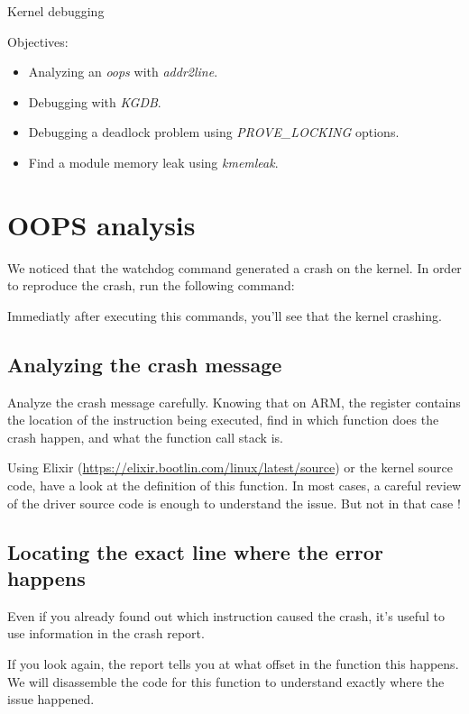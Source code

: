 \subchapter
{Kernel debugging}
{Objectives:
  \begin{itemize}
    \item Analyzing an {\em oops} with {\em addr2line}.
    \item Debugging with {\em KGDB}.
    \item Debugging a deadlock problem using {\em PROVE\_LOCKING} options.
    \item Find a module memory leak using {\em kmemleak}.
  \end{itemize}
}

\section{OOPS analysis}
We noticed that the watchdog command generated a crash on the kernel. In order
to reproduce the crash, run the following command:


Immediatly after executing this commands, you'll see that the kernel crashing.

\subsection{Analyzing the crash message}

Analyze the crash message carefully. Knowing that on ARM, the 
register contains the location of the instruction being executed, find
in which function does the crash happen, and what the function call
stack is.

Using Elixir (\url{https://elixir.bootlin.com/linux/latest/source}) or the
kernel source code, have a look at the definition of this function. In most
cases, a careful review of the driver source code is enough to understand the
issue. But not in that case !

\subsection{Locating the exact line where the error happens}

Even if you already found out which instruction caused the crash, it's
useful to use information in the crash report.

If you look again, the report tells you at what offset in the function
this happens. We will disassemble the code for this function to understand
exactly where the issue happened.


